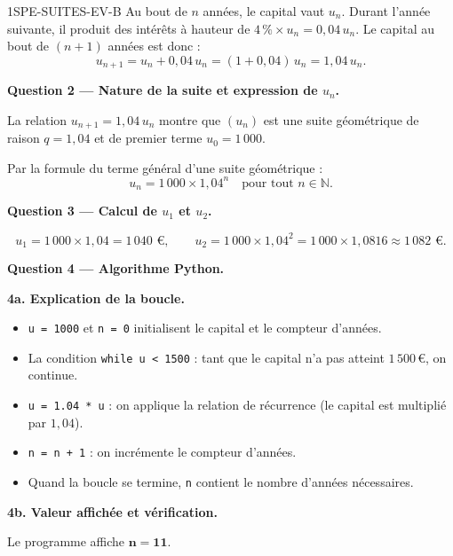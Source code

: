 \begin{corrige}{1SPE-SUITES-EV-B}
Au bout de $n$ années, le capital vaut $u_n$. Durant l'année suivante, il produit des intérêts à hauteur de $4\,\% \times u_n = 0{,}04\,u_n$. Le capital au bout de $(n+1)$ années est donc :
\[
  u_{n+1} = u_n + 0{,}04\,u_n = (1 + 0{,}04)\,u_n = 1{,}04\,u_n.
\]

\medskip
\textbf{Question 2 — Nature de la suite et expression de $u_n$.}


La relation $u_{n+1} = 1{,}04\,u_n$ montre que $(u_n)$ est une suite géométrique de raison $q = 1{,}04$ et de premier terme $u_0 = 1\,000$.

Par la formule du terme général d'une suite géométrique :
\[
  \boxed{u_n = 1\,000 \times 1{,}04^n} \quad \text{pour tout } n \in \mathbb{N}.
\]

\medskip
\textbf{Question 3 — Calcul de $u_1$ et $u_2$.}

\[
  u_1 = 1\,000 \times 1{,}04 = 1\,040 \text{ €}, \qquad
  u_2 = 1\,000 \times 1{,}04^2 = 1\,000 \times 1{,}0816 \approx 1\,082 \text{ €}.
\]

\medskip
\textbf{Question 4 — Algorithme Python.}

\textbf{4a. Explication de la boucle.}


\begin{itemize}
  \item \texttt{u = 1000} et \texttt{n = 0} initialisent le capital et le compteur d'années.
  \item La condition \texttt{while u < 1500} : tant que le capital n'a pas atteint $1\,500$\,€, on continue.
  \item \texttt{u = 1.04 * u} : on applique la relation de récurrence (le capital est multiplié par $1{,}04$).
  \item \texttt{n = n + 1} : on incrémente le compteur d'années.
  \item Quand la boucle se termine, \texttt{n} contient le nombre d'années nécessaires.
\end{itemize}

\textbf{4b. Valeur affichée et vérification.}


Le programme affiche $\mathbf{n = 11}$.


\end{corrige}
